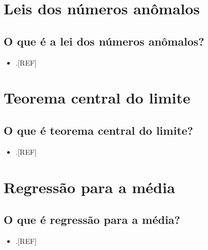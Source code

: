 \documentclass[
  a4paper,
]{book}
\providecommand{\tightlist}{%
  \setlength{\itemsep}{0pt}\setlength{\parskip}{0pt}}
\begin{document}
\hypertarget{lei-numeros-anomals}{%
\section{Leis dos números anômalos}\label{lei-numeros-anomals}}

\hypertarget{o-que-uxe9-a-lei-dos-nuxfameros-anuxf4malos}{%
\subsection{O que é a lei dos números anômalos?}\label{o-que-uxe9-a-lei-dos-nuxfameros-anuxf4malos}}

\begin{itemize}
\tightlist
\item
  .{[}REF{]}
\end{itemize}

\hypertarget{teorema-central-limite}{%
\section{Teorema central do limite}\label{teorema-central-limite}}

\hypertarget{o-que-uxe9-teorema-central-do-limite}{%
\subsection{O que é teorema central do limite?}\label{o-que-uxe9-teorema-central-do-limite}}

\begin{itemize}
\tightlist
\item
  .{[}REF{]}
\end{itemize}

\hypertarget{regressao-media}{%
\section{Regressão para a média}\label{regressao-media}}

\hypertarget{o-que-uxe9-regressuxe3o-para-a-muxe9dia}{%
\subsection{O que é regressão para a média?}\label{o-que-uxe9-regressuxe3o-para-a-muxe9dia}}

\begin{itemize}
\tightlist
\item
  .{[}REF{]}
\end{itemize}
\end{document}
